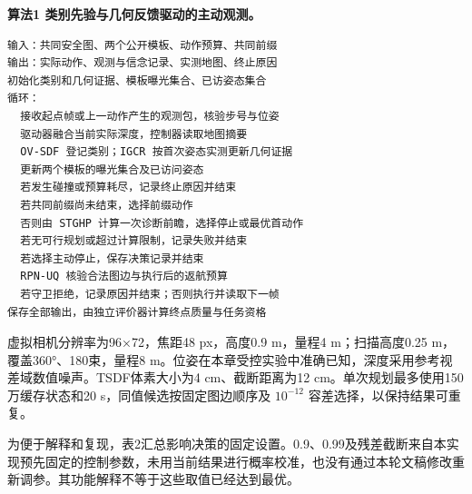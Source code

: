 \documentclass[11pt,a4paper]{article}
\begin{document}
\par\noindent\begin{minipage}{\linewidth}
\small
\textbf{算法1 类别先验与几何反馈驱动的主动观测。}

\begin{verbatim}
输入：共同安全图、两个公开模板、动作预算、共同前缀
输出：实际动作、观测与信念记录、实测地图、终止原因
初始化类别和几何证据、模板曝光集合、已访姿态集合
循环：
  接收起点帧或上一动作产生的观测包，核验步号与位姿
  驱动器融合当前实际深度，控制器读取地图摘要
  OV-SDF 登记类别；IGCR 按首次姿态实测更新几何证据
  更新两个模板的曝光集合及已访问姿态
  若发生碰撞或预算耗尽，记录终止原因并结束
  若共同前缀尚未结束，选择前缀动作
  否则由 STGHP 计算一次诊断前瞻，选择停止或最优首动作
  若无可行规划或超过计算限制，记录失败并结束
  若选择主动停止，保存决策记录并结束
  RPN-UQ 核验合法图边与执行后的返航预算
  若守卫拒绝，记录原因并结束；否则执行并读取下一帧
保存全部输出，由独立评价器计算终点质量与任务资格
\end{verbatim}
\end{minipage}


虚拟相机分辨率为96×72，焦距48 px，高度0.9 m，量程4 m；扫描高度0.25 m，覆盖360°、180束，量程8 m。位姿在本章受控实验中准确已知，深度采用参考视差域数值噪声。TSDF体素大小为4 cm、截断距离为12 cm。单次规划最多使用150万缓存状态和20 s，同值候选按固定图边顺序及 \(10^{-12}\) 容差选择，以保持结果可重复。

为便于解释和复现，表2汇总影响决策的固定设置。0.9、0.99及残差截断来自本实现预先固定的控制参数，未用当前结果进行概率校准，也没有通过本轮文稿修改重新调参。其功能解释不等于这些取值已经达到最优。
\end{document}
